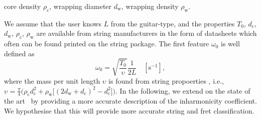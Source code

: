 \documentclass{article}
\begin{document}
\begin{sloppy}
\begin{itemize}
    core density $ \rho_\text{c}$, %
    wrapping diameter $ d_\text{w}$, %
    wrapping density $\rho_\text{w}$.%
\end{itemize}
%
We assume that the user knows $L$ from the guitar-type, and the properties ${T_0}$, ${d_\text{c}}$, ${d_\text{w}}$, ${\rho_\text{c}}$, ${\rho_\text{w}}$ are available from string manufacturers in the form of datasheets which often can be found printed on the string package. 
\noindent The first feature $\omega_0$ is well defined as
\begin{equation}\label{eq:omega_0}
    \omega_0 = \sqrt{\frac{T_0}{ \upsilon}} \frac{1}{2L} \quad [\text{s}^{-1}],
\end{equation}
where the mass per unit length $\upsilon$ is found from string propoerties \cite{firth1984}, i.e.,
    $\upsilon = \frac{\pi}{4}\Big(\rho_\text{c}d_\text{c}^2 + \rho_\text{w}\big[(2d_\text{w}+d_\text{c})^2-d_\text{c}^2\big]\Big)$. %
In the following, we extend on the state of the art~\cite{rossing:science_of_string_instruments} by providing a more accurate description of %
the inharmonicity coefficient. We hypothesise that this will provide more accurate string and fret classification. %
%
%

\end{sloppy}
\end{document}
